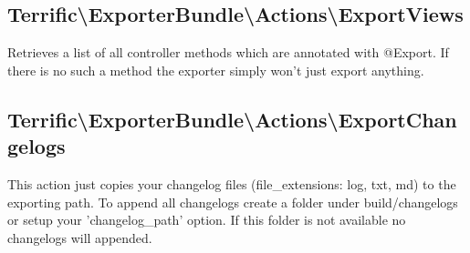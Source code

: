 \noindent \begin{minipage}{\textwidth}
\vspace{1.5em}
\hypertarget{sec-Actions-ExportViews}{\subsection{Terrific\textnormal{\textbackslash}ExporterBundle\textnormal{\textbackslash}Actions\textnormal{\textbackslash}ExportViews}}
Retrieves a list of all controller methods which are annotated with @Export. If there is no such a method the exporter simply won't just export anything.
\end{minipage}

\noindent \begin{minipage}{\textwidth}
\vspace{1.5em}
\hypertarget{sec-Actions-ExportChangelogs}{\subsection{Terrific\textnormal{\textbackslash}ExporterBundle\textnormal{\textbackslash}Actions\textnormal{\textbackslash}ExportChangelogs}}
This action just copies your changelog files (file\_extensions: log, txt, md) to the exporting path. To append all changelogs create a folder under build/changelogs or setup your \mbox{'changelog\_path'} option. If this folder is not available no changelogs will appended.
\end{minipage}
